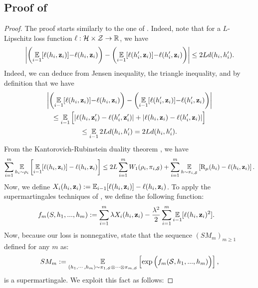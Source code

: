 \documentclass{article}
\begin{document}
\subsection{Proof of }
\label{sec:proof-online}
\theoremonline*
\begin{proof}
The proof starts similarly to the one of .
Indeed, note that for a $L$-Lipschitz loss function $\ell: \mathcal{H}\times\mathcal{Z}\to\mathbb{R}$, we have
\begin{align}
\left\vert\left( \operatorname*{\mathbb{E}}_{i-1}[\ell(h_i,\mathbf{z}_i)]{-}\ell(h_i, \mathbf{z}_i)\right) - \left( \operatorname*{\mathbb{E}}_{i-1}[\ell(h'_i,\mathbf{z}_i)]{-}\ell(h'_i, \mathbf{z}_i)\right)\right\vert \le 2Ld(h_i, h'_i).\label{eq:proof-online-1}
\end{align}
Indeed, we can deduce  from Jensen inequality, the triangle inequality, and by definition that we have
\begin{multline*}
\left\vert\left(\operatorname*{\mathbb{E}}_{i-1}[\ell(h_i,\mathbf{z}_i)]{-}\ell(h_i, \mathbf{z}_i)\right) - \left(\operatorname*{\mathbb{E}}_{i-1}[\ell(h'_i,\mathbf{z}_i)]{-}\ell(h'_i, \mathbf{z}_i)\right)\right\vert \\ 
\le \operatorname*{\mathbb{E}}_{i-1}\Big[ |\ell(h_i, \mathbf{z}'_i)-\ell(h'_i, \mathbf{z}'_i)|+|\ell(h_i, \mathbf{z}_i)-\ell(h'_i, \mathbf{z}_i)|\Big]\\
 \le \operatorname*{\mathbb{E}}_{i-1} 2Ld(h_i, h'_i) = 2Ld(h_i, h'_i).
\end{multline*}
From the Kantorovich-Rubinstein duality theorem \cite[Remark 6.5]{villani2009optimal}, we have
\begin{align*}
\sum_{i=1}^{m}\operatorname*{\mathbb{E}}_{h_i\sim\rho_{i}}\left[\operatorname*{\mathbb{E}}_{i-1}[\ell(h_i,\mathbf{z}_i)]-\ell(h_i, \mathbf{z}_i) \right] \le 2L\sum_{i=1}^{m}W_1(\rho_{i}, \pi_{i,\mathcal{S}}) + \sum_{i=1}^{m}\operatorname*{\mathbb{E}}_{h\sim\pi_{i,\mathcal{S}}}\left[\text{R}_{\mu}(h_i)-\ell(h_i, \mathbf{z}_i) \right].
\end{align*}
Now, we define $X_i(h_i,\mathbf{z}_i):= \operatorname*{\mathbb{E}}_{i-1}[\ell(h_i,\mathbf{z}_i)]- \ell(h_i, \mathbf{z}_i)$. 
To apply the supermartingales techniques of \cite{chugg2023unified}, we define the following function:
\begin{align*}
   f_m(S,h_1,...,h_m) & := \sum_{i=1}^m \lambda X_i(h_i,\mathbf{z}_i)  - \frac{\lambda^2}{2}\sum_{i=1}^m \operatorname*{\mathbb{E}}_{i-1}[\ell(h_i, \mathbf{z}_i)^2].
   \end{align*}
    Now, because our loss is nonnegative, \cite[][Lemma A.2 and Lemma B.1]{chugg2023unified} state that the sequence $(SM_m)_{m\geq 1}$ defined for any $m$ as:
    \begin{align*}
    SM_m := \operatorname*{\mathbb{E}}_{(h_1,\cdots,h_m) \sim \pi_{1,\mathcal{S}} \otimes \cdots \otimes \pi_{m,\mathcal{S}}} \left[ \exp \Big( f_m(\mathcal{S},h_1,...,h_m) \Big)  \right],
    \end{align*}
    is a supermartingale. 
    We exploit this fact as follows:

\end{proof}
\end{document}
